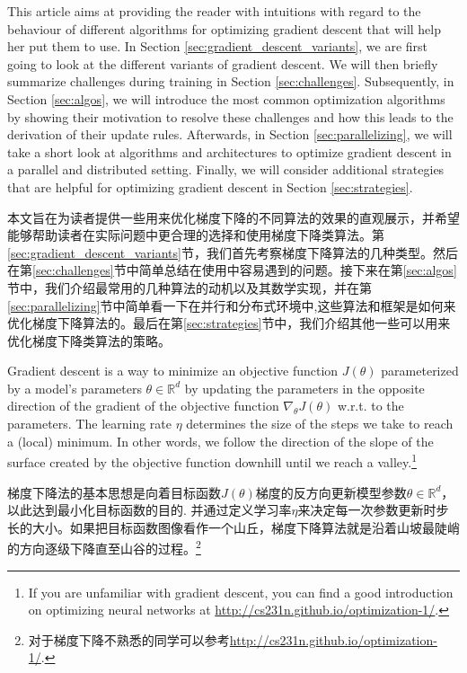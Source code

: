 \documentclass{article}
\begin{document}
This article aims at providing the reader with intuitions with regard to the behaviour of different algorithms for optimizing gradient descent that will help her put them to use. In Section \ref{sec:gradient_descent_variants}, we are first going to look at the different variants of gradient descent. We will then briefly summarize challenges during training in Section \ref{sec:challenges}. Subsequently, in Section \ref{sec:algos}, we will introduce the most common optimization algorithms by showing their motivation to resolve these challenges and how this leads to the derivation of their update rules. Afterwards, in Section \ref{sec:parallelizing}, we will take a short look at algorithms and architectures to optimize gradient descent in a parallel and distributed setting. Finally, we will consider additional strategies that are helpful for optimizing gradient descent in Section \ref{sec:strategies}.

本文旨在为读者提供一些用来优化梯度下降的不同算法的效果的直观展示，并希望能够帮助读者在实际问题中更合理的选择和使用梯度下降类算法。第\ref{sec:gradient_descent_variants}节，我们首先考察梯度下降算法的几种类型。然后在第\ref{sec:challenges}节中简单总结在使用中容易遇到的问题。接下来在第\ref{sec:algos}节中，我们介绍最常用的几种算法的动机以及其数学实现，并在第\ref{sec:parallelizing}节中简单看一下在并行和分布式环境中,这些算法和框架是如何来优化梯度下降算法的。最后在第\ref{sec:strategies}节中，我们介绍其他一些可以用来优化梯度下降类算法的策略。

Gradient descent is a way to minimize an objective function $J(\theta)$ parameterized by a model's parameters $\theta \in \mathbb{R}^d$ by updating the parameters in the opposite direction of the gradient of the objective function $\nabla_\theta J(\theta)$ w.r.t. to the parameters. The learning rate $\eta$ determines the size of the steps we take to reach a (local) minimum. In other words, we follow the direction of the slope of the surface created by the objective function downhill until we reach a valley.\footnote{If you are unfamiliar with gradient descent, you can find a good introduction on optimizing neural networks at \url{http://cs231n.github.io/optimization-1/}.}

梯度下降法的基本思想是向着目标函数$J(\theta)$梯度的反方向更新模型参数$\theta \in \mathbb{R}^d$，以此达到最小化目标函数的目的. 并通过定义学习率$\eta$来决定每一次参数更新时步长的大小。如果把目标函数图像看作一个山丘，梯度下降算法就是沿着山坡最陡峭的方向逐级下降直至山谷的过程。\footnote{对于梯度下降不熟悉的同学可以参考\url{http://cs231n.github.io/optimization-1/}.}
\end{document}
